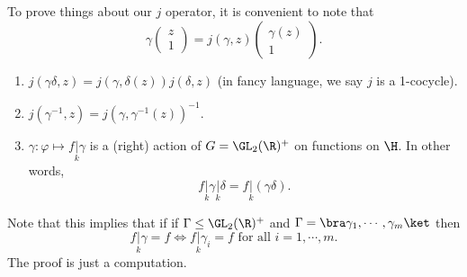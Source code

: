 \documentclass[a4paper]{article}
\begin{document}
To prove things about our $j$ operator, it is convenient to note that
\[
  \gamma
  \begin{pmatrix}
    z\\1
  \end{pmatrix}
  = j(\gamma, z)
  \begin{pmatrix}
    \gamma(z)\\1
  \end{pmatrix}.\tag{$*$}
\]
\begin{prop}\leavevmode
  \begin{enumerate}
    \item $j(\gamma\delta, z) = j(\gamma, \delta(z)) j(\delta, z)$ (in fancy language, we say $j$ is a 1-cocycle).
    \item $j(\gamma^{-1}, z) = j (\gamma, \gamma^{-1}(z))^{-1}$.
    \item $\gamma: \varphi \mapsto f\underset{k}{|} \gamma$ is a (right) action of $G = \GL_2(\R)^+$ on functions on $\H$. In other words,
      \[
        f\underset{k}{|} \gamma \underset{k}{|} \delta = f\underset{k}{|}(\gamma\delta).
      \]
  \end{enumerate}
\end{prop}
Note that this implies that if if $\Gamma \leq \GL_2(\R)^+$ and $\Gamma = \bra \gamma_1, \cdots, \gamma_m\ket$ then
\[
  f\underset{k}{|} \gamma = f\Longleftrightarrow f\underset{k}{|} \gamma_i = f\text{ for all }i = 1, \cdots, m.
\]
The proof is just a computation.
\end{document}
